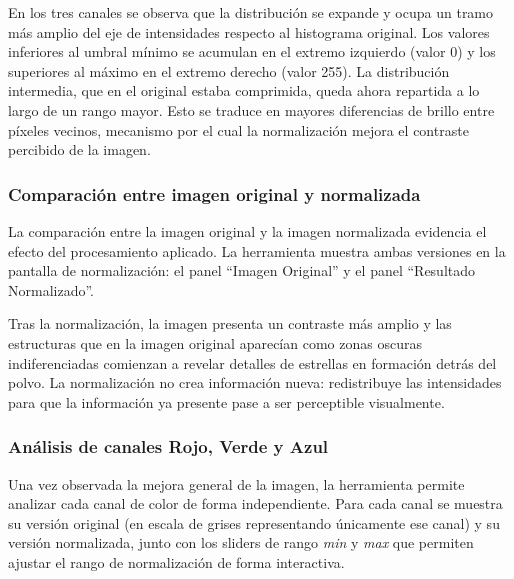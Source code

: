 \documentclass[11pt]{article}
\begin{document}

En los tres canales se observa que la distribución se expande y ocupa un tramo más amplio del eje de intensidades respecto al histograma original. Los valores inferiores al umbral mínimo se acumulan en el extremo izquierdo (valor 0) y los superiores al máximo en el extremo derecho (valor 255). La distribución intermedia, que en el original estaba comprimida, queda ahora repartida a lo largo de un rango mayor. Esto se traduce en mayores diferencias de brillo entre píxeles vecinos, mecanismo por el cual la normalización mejora el contraste percibido de la imagen.

\subsubsection{Comparación entre imagen original y normalizada}

La comparación entre la imagen original y la imagen normalizada evidencia el efecto del procesamiento aplicado. La herramienta muestra ambas versiones en la pantalla de normalización: el panel ``Imagen Original'' y el panel ``Resultado Normalizado''.


Tras la normalización, la imagen presenta un contraste más amplio y las estructuras que en la imagen original aparecían como zonas oscuras indiferenciadas comienzan a revelar detalles de estrellas en formación detrás del polvo. La normalización no crea información nueva: redistribuye las intensidades para que la información ya presente pase a ser perceptible visualmente.

\subsubsection{Análisis de canales Rojo, Verde y Azul}

Una vez observada la mejora general de la imagen, la herramienta permite analizar cada canal de color de forma independiente. Para cada canal se muestra su versión original (en escala de grises representando únicamente ese canal) y su versión normalizada, junto con los sliders de rango \textit{min} y \textit{max} que permiten ajustar el rango de normalización de forma interactiva.
\end{document}
